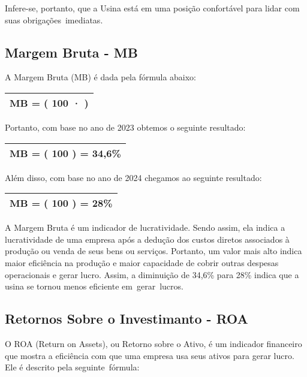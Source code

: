 \documentclass[1pt,a4paper]{article}
\begin{document}
		Infere-se, portanto, que a Usina está em uma posição confortável para lidar com suas obrigações imediatas. 
	
	\subsection{Margem Bruta - MB}
	
	\hspace*{1.5cm} A Margem Bruta (MB) é dada pela fórmula abaixo:
		\begin{center}
			\begin{tabular}{|c|}
				\hline
				MB = \left( 100 · \left[ \frac{LUCRO \, BRUTO}{RECEITA \, LIQUIDA} \right] \right)  \\
				\hline
			\end{tabular}
		\end{center}
	Portanto, com base no ano de 2023 obtemos o seguinte resultado:
		\begin{center}
			\begin{tabular}{|c|}
				\hline
				MB = \left( 100  \left[ \frac{1.749.674}{4.376.917} \right] \right) = 34,6\% \\
				\hline
			\end{tabular}
		\end{center}
	Além disso, com base no ano de 2024 chegamos ao seguinte resultado:
		\begin{center}
			\begin{tabular}{|c|}
				\hline
				MB = \left( 100  \left[ \frac{1.384.286}{4.928.662} \right] \right) = 28\% \\
				\hline
			\end{tabular}
		\end{center}
		
	A Margem Bruta é um indicador de lucratividade. Sendo assim, ela indica a lucratividade de uma empresa após a dedução dos custos diretos associados à produção ou venda de seus bens ou serviços. Portanto, um valor mais alto indica maior eficiência na produção e maior capacidade de cobrir outras despesas operacionais e gerar lucro. Assim, a diminuição de 34,6\% para 28\% indica que a usina se tornou menos eficiente em gerar lucros.
		
	\subsection{Retornos Sobre o Investimanto - ROA}
	
	\hspace*{1.5cm} O ROA (Return on Assets), ou Retorno sobre o Ativo, é um indicador financeiro que mostra a eficiência com que uma empresa usa seus ativos para gerar lucro. Ele é descrito pela seguinte fórmula:
		
\end{document}
